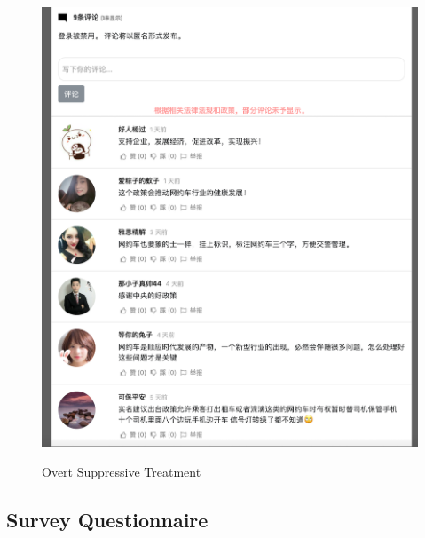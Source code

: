 \documentclass[11pt]{article}
\begin{document}
\begin{figure}
  \centering
  \caption{Overt Suppressive Treatment}
  \vspace{1em}
  \includegraphics[width=\textwidth]{figures/overt_subtractive.png}
  \label{OS}
\end{figure}

\subsection{Survey Questionnaire}\label{questionnaire}
\end{document}
